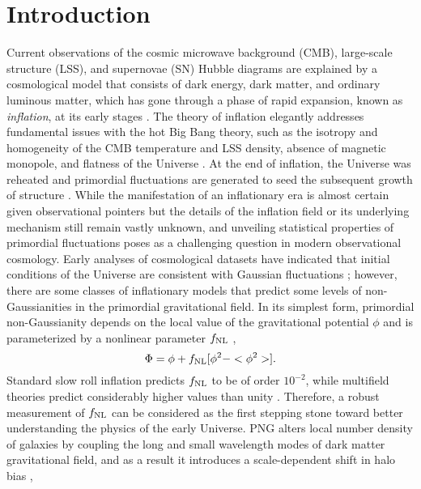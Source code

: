 \section{Introduction}
\label{sec:introduction}
Current observations of the cosmic microwave background (CMB), large-scale structure (LSS), and supernovae (SN) Hubble diagrams are explained by a cosmological model that consists of dark energy, dark matter, and ordinary luminous matter, which has gone through a phase of rapid expansion, known as \textit{inflation},  at its early stages \citep[see, e.g.,][]{weinberg2013observational}. The theory of inflation elegantly addresses fundamental issues with the hot Big Bang theory, such as the isotropy and homogeneity of the CMB temperature and LSS density, absence of magnetic monopole, and flatness of the Universe \citep[see, e.g.,][]{weinberg2008cosmology}. At the end of inflation, the Universe was reheated and primordial fluctuations are generated to seed the subsequent growth of structure \citep{kofman1994reheating, bassett2006inflation, lyth2009primordial}. While the manifestation of an inflationary era is almost certain given observational pointers but the details of the inflation field or its underlying mechanism still remain vastly unknown, and unveiling statistical properties of primordial fluctuations poses as a challenging question in modern observational cosmology. Early analyses of cosmological datasets have indicated that initial conditions of the Universe are consistent with Gaussian fluctuations \citep{guth2005inflationary}; however, there are some classes of inflationary models that predict some levels of non-Gaussianities in the primordial gravitational field. In its simplest form, primordial non-Gaussianity depends on the local value of the gravitational potential $\phi$ and is parameterized by a nonlinear parameter $f_{\rm NL}$ \citep{komatsu2001acoustic},
\begin{equation}
    \Phi = \phi + f_{\rm NL} [\phi^{2} -  <\phi^{2}>].
\end{equation}
Standard slow roll inflation predicts $f_{\rm NL}$ to be of order $10^{-2}$, while multifield theories predict considerably higher values than unity \citep[see, e.g.,][]{de2017next}. Therefore, a robust measurement of $f_{\rm NL}$ can be considered as the first stepping stone toward better understanding the physics of the early Universe.  PNG alters local number density of galaxies by coupling the long and small wavelength modes of dark matter gravitational field, and as a result it introduces a scale-dependent shift in halo bias \citep[see, e.g.,][]{dalal2008imprints, slosar2008constraints},
